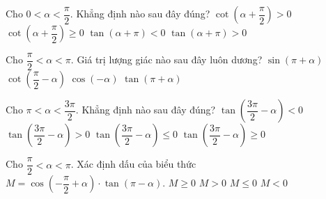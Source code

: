 \begin{ex}%
Cho $0<\alpha <\dfrac{\pi}{2}.$ Khẳng định nào sau đây đúng?
\choice
{$\cot \left({\alpha+\dfrac{\pi}{2}}\right)>0$}
{$\cot \left({\alpha+\dfrac{\pi}{2}}\right)\geqslant 0$}
{$\tan \left({\alpha+\pi}\right)<0$}
{\True $\tan \left({\alpha+\pi}\right)>0$}
\end{ex}

\begin{ex}%
Cho $\dfrac{\pi}{2}<\alpha <\pi.$ Giá trị lượng giác nào sau đây luôn dương?
\choice
{$\sin \left({\pi+\alpha}\right)$}
{\True $\cot \left({\dfrac{\pi}{2}-\alpha}\right)$}
{$\cos \left({-\alpha}\right)$}
{$\tan \left({\pi+\alpha}\right)$}
\end{ex}

\begin{ex}%
Cho $\pi <\alpha <\dfrac{{3\pi}}{2}.$ Khẳng định nào sau đây đúng?
\choice
{$\tan \left({\dfrac{{3\pi}}{2}-\alpha}\right)<0$}
{\True $\tan \left({\dfrac{{3\pi}}{2}-\alpha}\right)>0$}
{$\tan \left({\dfrac{{3\pi}}{2}-\alpha}\right)\leqslant 0$}
{$\tan \left({\dfrac{{3\pi}}{2}-\alpha}\right)\geqslant 0$}
 \end{ex}

\begin{ex}%
Cho $\dfrac{\pi}{2}<\alpha <\pi $. Xác định dấu của biểu thức $M=\cos \left({-\dfrac{\pi}{2}+\alpha}\right) \cdot\tan \left({\pi-\alpha}\right).$
\choice
{$M\geqslant 0$}
{\True $M>0$}
{$M\leqslant 0$}
{$M<0$}
\end{ex}

